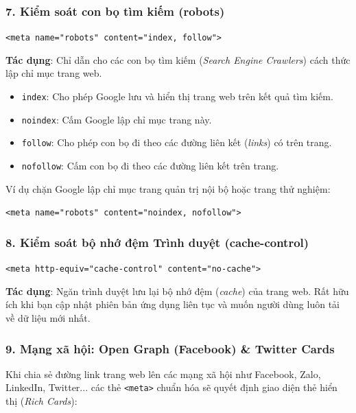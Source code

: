 \documentclass[11pt,oneside]{book}
\newcommand{\codeinline}[1]{\textcolor{accentOrange}{\texttt{#1}}}
\begin{document}
\subsubsection{7. Kiểm soát con bọ tìm kiếm (robots)}
\begin{center}
\codeinline{<meta name="robots" content="index, follow">}
\end{center}
\textbf{Tác dụng}: Chỉ dẫn cho các con bọ tìm kiếm (\textit{Search Engine Crawlers}) cách thức lập chỉ mục trang web.
\begin{itemize}[leftmargin=1.8em, itemsep=2pt, parsep=0pt]
    \item \codeinline{index}: Cho phép Google lưu và hiển thị trang web trên kết quả tìm kiếm.
    \item \codeinline{noindex}: Cấm Google lập chỉ mục trang này.
    \item \codeinline{follow}: Cho phép con bọ đi theo các đường liên kết (\textit{links}) có trên trang.
    \item \codeinline{nofollow}: Cấm con bọ đi theo các đường liên kết trên trang.
\end{itemize}

Ví dụ chặn Google lập chỉ mục trang quản trị nội bộ hoặc trang thử nghiệm:
\begin{center}
\codeinline{<meta name="robots" content="noindex, nofollow">}
\end{center}

\subsubsection{8. Kiểm soát bộ nhớ đệm Trình duyệt (cache-control)}
\begin{center}
\codeinline{<meta http-equiv="cache-control" content="no-cache">}
\end{center}
\textbf{Tác dụng}: Ngăn trình duyệt lưu lại bộ nhớ đệm (\textit{cache}) của trang web. Rất hữu ích khi bạn cập nhật phiên bản ứng dụng liên tục và muốn người dùng luôn tải về dữ liệu mới nhất.

\subsubsection{9. Mạng xã hội: Open Graph (Facebook) \& Twitter Cards}

Khi chia sẻ đường link trang web lên các mạng xã hội như Facebook, Zalo, LinkedIn, Twitter... các thẻ \codeinline{<meta>} chuẩn hóa sẽ quyết định giao diện thẻ hiển thị (\textit{Rich Cards}):
\end{document}
